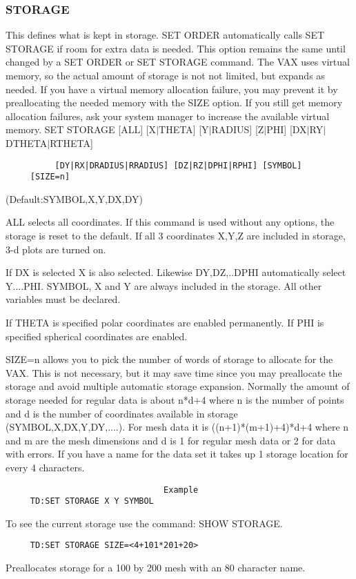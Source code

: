 \subsubsection{STORAGE}
This  defines  what  is kept in storage.  SET ORDER automatically calls
SET STORAGE if room for extra data is needed.  This option remains  the
same until changed by a SET ORDER or SET STORAGE command.  The VAX uses
virtual memory, so the actual amount of storage is not not limited, but
expands  as  needed.   If you have a virtual memory allocation failure,
you may prevent it by preallocating the needed  memory  with  the  SIZE
option.   If  you still get memory allocation failures, ask your system
manager to increase the available virtual memory.  
SET STORAGE [ALL] [X$|$THETA] [Y$|$RADIUS] [Z$|$PHI] [DX$|$RY$|$DTHETA$|$RTHETA]
\begin{verbatim}
          [DY|RX|DRADIUS|RRADIUS] [DZ|RZ|DPHI|RPHI] [SYMBOL] 
     [SIZE=n] 
\end{verbatim}

(Default:SYMBOL,X,Y,DX,DY) 

ALL  selects  all  coordinates.   If  this  command is used without any
options, the storage is reset to the default.   If  all  3  coordinates
X,Y,Z are included in storage, 3-d plots are turned on.  

If   DX   is  selected  X  is  also  selected.   Likewise  DY,DZ,..DPHI
automatically select Y....PHI.  SYMBOL, X and Y are always included  in
the storage.  All other variables must be declared.  

If  THETA  is  specified polar coordinates are enabled permanently.  If
PHI is specified spherical coordinates are enabled.  

SIZE=n  allows  you  to pick the number of words of storage to allocate
for the VAX.  This is not necessary, but it may save time since you may
preallocate the storage and avoid multiple automatic storage expansion.
Normally the amount of storage needed for regular data is  about  n*d+4
where  n  is  the  number  of points and d is the number of coordinates
available in storage (SYMBOL,X,DX,Y,DY,....).   For  mesh  data  it  is
((n+1)*(m+1)+4)*d+4  where  n  and m are the mesh dimensions and d is 1
for regular mesh data or 2 for data with errors.  If you  have  a  name
for the data set it takes up 1 storage location for every 4 characters. 

\begin{verbatim}
                                Example
     TD:SET STORAGE X Y SYMBOL 
\end{verbatim}
To see the current storage use the command:  SHOW STORAGE.  
\begin{verbatim}
     TD:SET STORAGE SIZE=<4+101*201+20> 
\end{verbatim}
Preallocates storage for a 100 by 200 mesh with an 80 character name.  
